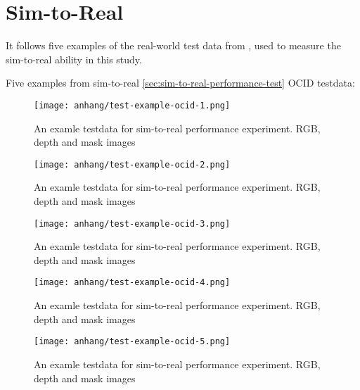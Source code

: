 \chapter{Sim-to-Real}
\label{appendix:testdata-examples-simtoreal}

	It follows five examples of the real-world test data from \cite{Suchi2019}, used to measure the sim-to-real ability in this study.
	
	Five examples from sim-to-real \ref{sec:sim-to-real-performance-test} OCID testdata:
	\begin{figure}[H]
		\centering
		\texttt{[image: anhang/test-example-ocid-1.png]}
		\caption[An examle testdata for sim-to-real performance experiment. RGB, depth and mask images]{An examle testdata for sim-to-real performance experiment. RGB, depth and mask images}
	\end{figure}
	\begin{figure}[H]
		\centering
		\texttt{[image: anhang/test-example-ocid-2.png]}
		\caption[An examle testdata for sim-to-real performance experiment. RGB, depth and mask images]{An examle testdata for sim-to-real performance experiment. RGB, depth and mask images}
	\end{figure}
	\begin{figure}[H]
		\centering
		\texttt{[image: anhang/test-example-ocid-3.png]}
		\caption[An examle testdata for sim-to-real performance experiment. RGB, depth and mask images]{An examle testdata for sim-to-real performance experiment. RGB, depth and mask images}
	\end{figure}
	\begin{figure}[H]
		\centering
		\texttt{[image: anhang/test-example-ocid-4.png]}
		\caption[An examle testdata for sim-to-real performance experiment. RGB, depth and mask images]{An examle testdata for sim-to-real performance experiment. RGB, depth and mask images}
	\end{figure}
	\begin{figure}[H]
		\centering
		\texttt{[image: anhang/test-example-ocid-5.png]}
		\caption[An examle testdata for sim-to-real performance experiment. RGB, depth and mask images]{An examle testdata for sim-to-real performance experiment. RGB, depth and mask images}
	\end{figure}
	
